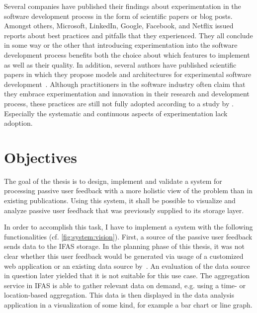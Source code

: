 Several companies have published their findings about experimentation in the software development process in the form of scientific papers or blog posts.
Amongst others, Microsoft, LinkedIn, Google, Facebook, and Netflix issued reports about best practices and pitfalls that they experienced\cite{Kohavi2013,Xu2015,Tang2010,Bakshy2014,WEB:Netflix:2016}.
They all conclude in some way or the other that introducing experimentation into the software development process benefits both the choice about which features to implement as well as their quality.
In addition, several authors have published scientific papers in which they propose models and architectures for experimental software development~\cite{Fagerholm2014,Fagerholm2017,Johanssen2017,Lindgren2015}.
Although practitioners in the software industry often claim that they embrace experimentation and innovation in their research and development process, these practices are still not fully adopted according to a study by \citet{lindgren2015software}.
Especially the systematic and continuous aspects of experimentation lack adoption.




\section{Objectives}
\label{sec:intro:objectives}


The goal of the thesis is to design, implement and validate a system for processing passive user feedback with a more holistic view of the problem than in existing publications.
Using this system, it shall be possible to visualize and analyze passive user feedback that was previously supplied to its storage layer.

In order to accomplish this task, I have to implement a system with the following functionalities (cf. \cref{fig:system:vision}).
First, a source of the passive user feedback sends data to the \ac{IFAS} storage.
In the planning phase of this thesis, it was not clear whether this user feedback would be generated via usage of a customized web application or an existing data source by~\citet{Deka:2017:Rico}.
An evaluation of the data source in question later yielded that it is not suitable for this use case.
The aggregation service in \ac{IFAS} is able to gather relevant data on demand, e.g. using a time- or location-based aggregation.
This data is then displayed in the data analysis application in a visualization of some kind, for example a bar chart or line graph.

